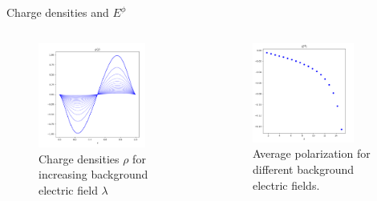 \begin{frame}{Charge densities and $E^{\phi}$}
	\begin{columns}
	    \begin{column}{0.5\textwidth}
	    \begin{figure}[htpb]
	    	\centering
	    	\includegraphics[width=0.8\textwidth]{figures/charge-density.png}
	    	\caption{Charge densities $\rho$ for increasing background electric field $\lambda$}
	    	\label{fig:figures-charge-density-png}
	    \end{figure}
	    \end{column}

	    \begin{column}{0.5\textwidth}
	    \begin{figure}[h]
	    	\centering
	    	\includegraphics[width=0.8\textwidth]{figures/polarization.png}
	    	\caption{Average polarization for different background electric fields.}
	    	\label{fig:figures-polarization-png}
	    \end{figure}
    \end{column}
	\end{columns}

\end{frame}

